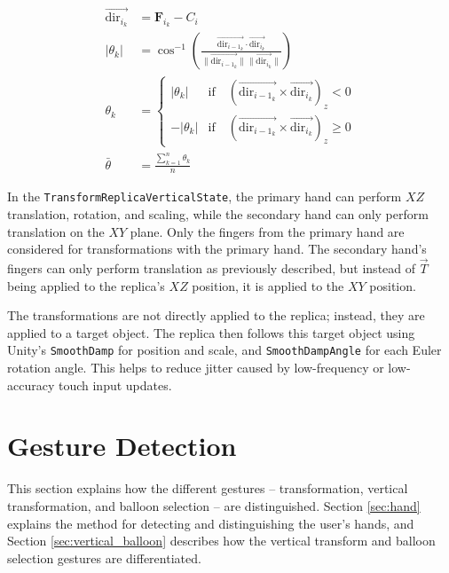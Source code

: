     \begin{equation}
    \begin{split} \label{eq:rotation}
        \vec{\mathrm{dir}_{i_k}} &= \mathbf{F}_{i_k} - C_i \\
        |\theta_k| &= \cos^{-1} \left( \frac{\vec{\mathrm{dir}_{{i-1}_k}} \cdot \vec{\mathrm{dir}_{i_k}}}{\|\vec{\mathrm{dir}_{{i-1}_k}}\| \|\vec{\mathrm{dir}_{i_k}}\|} \right) \\
        \theta_k &= \begin{cases} 
            |\theta_k| & \text{if} \quad (\vec{\mathrm{dir}_{{i-1}_k}} \times \vec{\mathrm{dir}_{i_k}})_z < 0 \\
            -|\theta_k| & \text{if} \quad (\vec{\mathrm{dir}_{{i-1}_k}} \times \vec{\mathrm{dir}_{i_k}})_z \geq 0
        \end{cases} \\
        \bar{\theta} &= \frac{\sum_{k=1}^{n} \theta_k}{n}
    \end{split}
    \end{equation}


    In the \lstinline{TransformReplicaVerticalState}, the primary hand can perform $XZ$ translation, rotation, and scaling, while the secondary hand can only perform translation on the $XY$ plane. Only the fingers from the primary hand are considered for transformations with the primary hand. The secondary hand's fingers can only perform translation as previously described, but instead of \(\vec{T}\) being applied to the replica's $XZ$ position, it is applied to the $XY$ position.
    
    The transformations are not directly applied to the replica; instead, they are applied to a target object. The replica then follows this target object using Unity's \lstinline{SmoothDamp} for position and scale, and \lstinline{SmoothDampAngle} for each Euler rotation angle. This helps to reduce jitter caused by low-frequency or low-accuracy touch input updates.

\section{Gesture Detection}

    This section explains how the different gestures -- transformation, vertical transformation, and balloon selection -- are distinguished. Section \ref{sec:hand} explains the method for detecting and distinguishing the user's hands, and Section \ref{sec:vertical_balloon} describes how the vertical transform and balloon selection gestures are differentiated.

